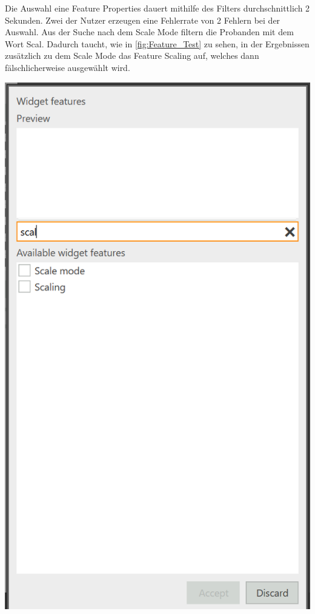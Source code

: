 Die Auswahl eine Feature Properties dauert mithilfe des Filters durchschnittlich 2 Sekunden.
Zwei der Nutzer erzeugen eine Fehlerrate von 2 Fehlern bei der Auswahl.
Aus der Suche nach dem Scale Mode filtern die Probanden mit dem Wort \glqq Scal\grqq{}.
Dadurch taucht, wie in \ref{fig:Feature_Test} zu sehen, in der Ergebnissen zusätzlich zu dem Scale Mode das Feature Scaling auf, welches dann fälschlicherweise ausgewählt wird.

\begin{center}
  \includegraphics[scale= 0.6]{figures/Feature_Test.PNG}
  \label{fig:Feature_Test}
\end{center}

